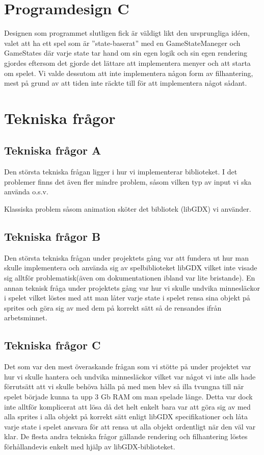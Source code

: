 \documentclass[a4paper,11pt]{article}
\begin{document}
\section{Programdesign C}
Designen som programmet slutligen fick är väldigt likt den ursprungliga idéen, valet att ha ett spel som är ”state-baserat” med en GameStateManeger och GameStates där varje state tar hand om sin egen logik och sin egen rendering gjordes eftersom det gjorde det lättare att implementera menyer och att starta om spelet. Vi valde dessutom att inte implementera någon form av filhantering, mest på grund av att tiden inte räckte till för att implementera något sådant.

\section{Tekniska frågor}
\subsection{Tekniska frågor A}
Den största tekniska frågan ligger i hur vi implementerar biblioteket. I det problemer finns det även fler mindre problem, såsom vilken typ av input vi ska använda o.s.v. 

Klassiska problem såsom animation sköter det bibliotek (libGDX) vi använder.

\subsection{Tekniska frågor B}
Den största tekniska frågan under projektets gång var att fundera ut hur man skulle implementera och använda sig av spelbiblioteket libGDX vilket inte visade sig alltför problematisk(även om dokumentationen ibland var lite bristande). En annan teknisk fråga under projektets gång var hur vi skulle undvika minnesläckor i spelet vilket löstes med att man låter varje state i spelet rensa sina objekt på sprites och göra sig av med dem på korrekt sätt så de rensandes ifrån arbetsminnet.

\subsection{Tekniska frågor C}
Det som var den mest överaskande frågan som vi stötte på under projektet var hur vi skulle hantera och undvika minnesläckor vilket var något vi inte alls hade förrutsätt att vi skulle behöva hålla på med men blev så illa tvungna till när spelet började kunna ta upp 3 Gb RAM om man spelade länge. Detta var dock inte alltför komplicerat att lösa då det helt enkelt bara var att göra sig av med alla sprites i alla objekt på korrekt sätt enligt libGDX specifikationer och låta varje state i spelet ansvara för att rensa ut alla objekt ordentligt när den väl var klar. De flesta andra tekniska frågor gällande rendering och filhantering löstes förhållandevis enkelt med hjälp av libGDX-biblioteket.
\end{document}
